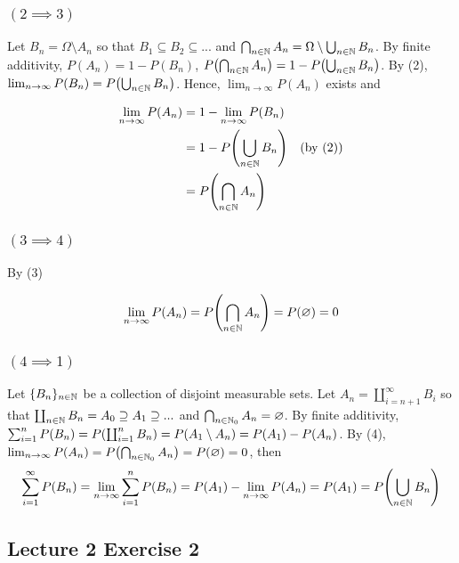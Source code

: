 \documentclass{article}
\begin{document}
\subsubsection{$(2 \implies 3)$}

Let $B_n = \Omega \setminus A_n$ so that $B_1 \subseteq B_2 \subseteq ...$ and $\bigcap_{n \in \mathbb{N}} A_n = \Omega \setminus \bigcup_{n \in \mathbb{N}} B_n$. By finite additivity, $P(A_n) = 1 - P(B_n)$, $P \tuple*{\bigcap_{n \in \N} A_n} = 1 - P \tuple*{\bigcup_{n \in \N} B_n}$. By (2), $\lim_{n \to \infty} P(B_n) = P \tuple*{\bigcup_{n \in \N} B_n}$. Hence, $\lim_{n \to \infty} P(A_n)$ exists and

\begin{align*}
    \lim_{n \to \infty} P(A_n)
    &= 1 - \lim_{n \to \infty} P(B_n) \\
    &= 1 - P \tuple*{\bigcup_{n \in \N} B_n} &\text{(by (2))}\\
    &= P \tuple*{\bigcap_{n \in \N} A_n}
\end{align*}
        

\subsubsection{$(3 \implies 4)$}

By (3)

$$
    \lim_{n \to \infty} P(A_n) = P \tuple*{\bigcap_{n \in \N} A_n} = P(\emptyset) = 0
$$

\subsubsection{$(4 \implies 1)$}

Let $\{B_n\}_{n \in \mathbb{N}}$ be a collection of disjoint measurable sets. Let $A_n = \coprod_{i=n+1}^\infty B_i$ so that $\coprod_{n \in \mathbb{N}} B_n = A_0 \supseteq A_1 \supseteq ...$ and $\bigcap_{n \in \mathbb{N}_0} A_n = \varnothing$. By finite additivity, $\sum_{i=1}^n P(B_n) = P\tuple*{\coprod_{i=1}^n B_n} = P(A_1 \setminus A_n) = P(A_1) - P(A_n)$. By (4), $\lim_{n \to \infty} P(A_n) = P\tuple*{\bigcap_{n \in \N_0} A_n} = P(\emptyset) = 0$, then
$$
    \sum_{i=1}^\infty P(B_n) = \lim_{n \to \infty} \sum_{i=1}^n P(B_n) = P(A_1) - \lim_{n \to \infty} P(A_n) = P(A_1) = P \tuple*{\bigcup_{n \in \N} B_n}
$$

\subsection{Lecture 2 Exercise 2}
\end{document}
